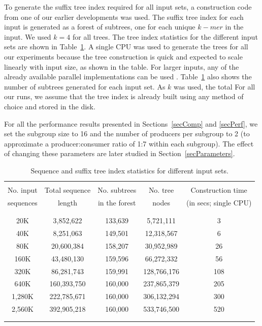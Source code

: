 \documentclass[10pt,journal,letterpaper,compsoc]{IEEEtran}
\def\colrule{\\[-7pt]\hline\\[-6pt]}
\begin{document}
To generate the suffix tree index required for all input sets, a construction code from one of our earlier developments \cite{Kalyanaraman07} was used. The suffix tree index for each input is generated as a forest of subtrees, one for each unique $k-mer$ in the input. We used $k=4$ for all trees. The tree index statistics for the different input sets are shown in Table~\ref{tabInputTrees}. A single CPU was used to generate the trees for all our experiments because the tree construction is quick and expected to scale linearly with input size, as shown in the table. For larger inputs, any of the already available parallel implementations can be used \cite{Ghoting09,Kalyanaraman07}. Table~\ref{tabInputTrees} also shows the number of subtrees generated for each input set. As $k$ was used, the total   For all our runs, we assume that the tree index is already built using any method of choice and stored in the disk.

For all the performance results presented in Sections~\ref{secComp} and \ref{secPerf}, we set the subgroup size to 16 and the number of producers per subgroup to 2 (to approximate a producer:consumer ratio of 1:7 within each subgroup). The effect of changing these parameters are later studied in Section~\ref{secParameters}.

\begin{table}[thb]
\begin{center}
\begin{tabular}{c|c|c|c|c|}
\colrule
No. input  & Total sequence & No. subtrees& No. tree & Construction time  \\
sequences & length & in the forest & nodes & (in secs; single CPU) \\
 \colrule
 20K & 3,852,622 & 133,639 & 5,721,111 & 3\\
 40K & 8,251,063 & 149,501 & 12,318,567 & 6 \\
 80K & 20,600,384 & 158,207 & 30,952,989 & 26\\
 160K & 43,480,130 & 159,596 & 66,272,332 & 56\\
 320K & 86,281,743 & 159,991 & 128,766,176 & 108\\
 640K & 160,393,750 & 160,000 & 237,865,379 & 205\\
 1,280K & 222,785,671 & 160,000 & 306,132,294 & 300\\
 2,560K& 392,905,218 & 160,000 & 533,746,500 & 520\\
\colrule
\end{tabular}
\end{center}
\caption{\label{tabInputTrees}
Sequence and suffix tree index statistics for different input sets.
}
\end{table}
\end{document}
